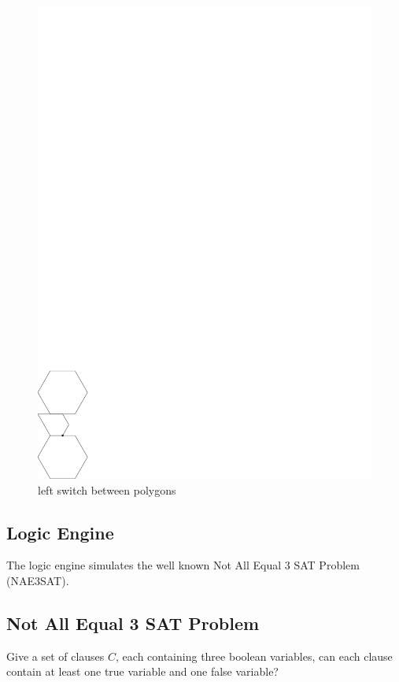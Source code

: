 \begin{figure}[!h]
\begin{center}
\includegraphics{graphics/LeftSwitchBetweenTwoPolygons.pdf}
\caption{left switch between polygons}
\end{center} 
\end{figure} 
\begin{figure}[!h]
\begin{center}  
\end{center} 
\end{figure} 
\subsection{Logic Engine}
The logic engine simulates the well known Not All Equal 3 SAT Problem (NAE3SAT).  
\subsection{Not All Equal 3 SAT Problem}
\begin{prob}\label{prob:Satisfiability-2}%
Give a set of clauses $C$, each containing three boolean variables, can each clause contain at 
least one true variable and one false variable?
\end{prob}
